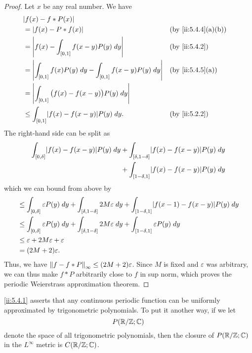 \begin{proof}
  Let \(x\) be any real number.
  We have
  \begin{align*}
     & \abs{f(x) - f * P(x)}                                                                             \\
     & = \abs{f(x) - P * f(x)}                                                   &  & \by{ii:5.4.4}[a,b] \\
     & = \abs{f(x) - \int_{[0, 1]} f(x - y) P(y) \; dy}                          &  & \by{ii:5.4.2}      \\
     & = \abs{\int_{[0, 1]} f(x) P(y) \; dy - \int_{[0, 1]} f(x - y) P(y) \; dy} &  & \by{ii:5.4.5}[a]   \\
     & = \abs{\int_{[0, 1]} \big(f(x) - f(x - y)\big) P(y) \; dy}                                        \\
     & \leq \int_{[0, 1]} \abs{f(x) - f(x - y)} P(y) \; dy.                      &  & \by{ii:5.2.2}
  \end{align*}
  The right-hand side can be split as
  \begin{align*}
    \int_{[0, \delta]} \abs{f(x) - f(x - y)} P(y) \; dy & + \int_{[\delta, 1 - \delta]} \abs{f(x) - f(x - y)} P(y) \; dy \\
                                                        & + \int_{[1 - \delta, 1]} \abs{f(x) - f(x - y)} P(y) \; dy
  \end{align*}
  which we can bound from above by
  \begin{align*}
     & \leq \int_{[0, \delta]} \varepsilon P(y) \; dy + \int_{[\delta, 1 - \delta]} 2 M \varepsilon \; dy + \int_{[1 - \delta, 1]} \abs{f(x - 1) - f(x - y)} P(y) \; dy \\
     & \leq \int_{[0, \delta]} \varepsilon P(y) \; dy + \int_{[\delta, 1 - \delta]} 2 M \varepsilon \; dy + \int_{[1 - \delta, 1]} \varepsilon P(y) \; dy               \\
     & \leq \varepsilon + 2 M \varepsilon + \varepsilon                                                                                                                 \\
     & = (2M + 2) \varepsilon.
  \end{align*}
  Thus, we have \(\norm*{f - f * P}_{\infty} \leq (2M + 2) \varepsilon\).
  Since \(M\) is fixed and \(\varepsilon\) was arbitrary, we can thus make \(f * P\) arbitrarily close to \(f\) in sup norm, which proves the periodic Weierstrass approximation theorem.
\end{proof}

\begin{note}
  \cref{ii:5.4.1} asserts that any continuous periodic function can be uniformly approximated by trigonometric polynomials.
  To put it another way, if we let
  \[
    P(\R / \Z ; \C)
  \]
  denote the space of all trigonometric polynomials, then the closure of \(P(\R / \Z ; \C)\) in the \(L^\infty\) metric is \(C(\R / \Z ; \C)\).
\end{note}

